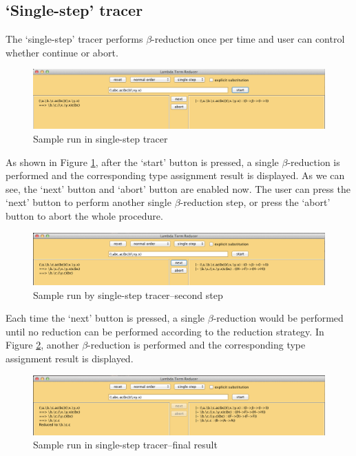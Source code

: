 \subsection{`Single-step' tracer}

The `single-step' tracer performs $\beta$-reduction once per time and user can control whether continue or abort. 

\begin{figure}[ht]
\centering
\includegraphics[width=\textwidth]{pics/single1}
\caption{Sample run in single-step tracer}
\label{fig:s1}
\end{figure}

As shown in Figure \ref{fig:s1}, after the `start' button is pressed, a single $\beta$-reduction is performed and the corresponding type assignment result is displayed. As we can see, the `next' button and `abort' button are enabled now. The user can press the `next' button to perform another single $\beta$-reduction step, or press the `abort' button to abort the whole procedure.  

\begin{figure}[ht]
\centering
\includegraphics[width=\textwidth]{pics/single2}
\caption{Sample run by single-step tracer--second step}
\label{fig:s2}
\end{figure}

Each time the `next' button is pressed, a single $\beta$-reduction would be performed until no reduction can be performed according to the reduction strategy. In Figure \ref{fig:s2}, another $\beta$-reduction is performed and the corresponding type assignment result is displayed. 

\begin{figure}[ht]
\centering
\includegraphics[width=\textwidth]{pics/single3}
\caption{Sample run in single-step tracer--final result}
\label{fig:s3}
\end{figure}

